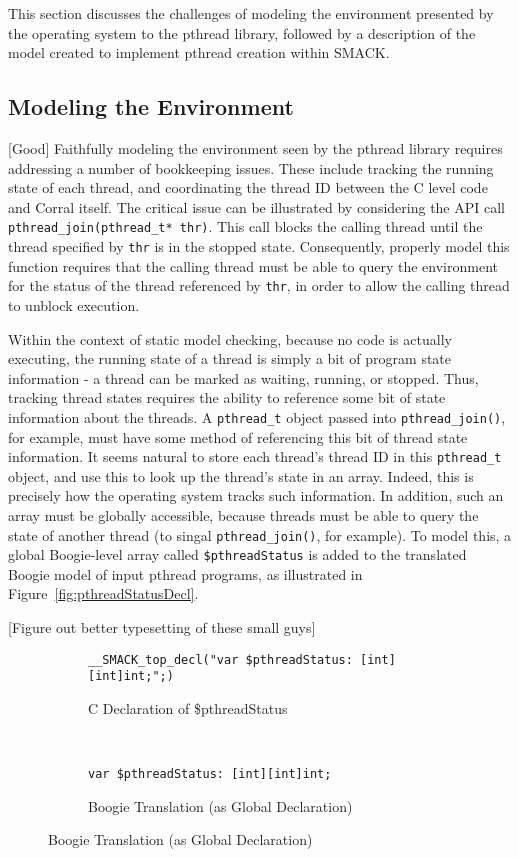 This section discusses the challenges of modeling the environment
presented by the operating system to the pthread library, followed by
a description of the model created to implement pthread creation
within SMACK.

\subsection{Modeling the Environment}
[Good]
Faithfully modeling the environment seen by the pthread library
requires addressing a number of bookkeeping issues.  These include
tracking the running state of each thread, and coordinating the thread
ID between the C level code and Corral itself.  The critical issue can
be illustrated by considering the API call
\lstinline|pthread_join(pthread_t* thr)|. This call blocks the calling
thread until the thread specified by \lstinline|thr| is in the stopped
state.  Consequently, properly model this function requires that the
calling thread must be able to query the environment for the status of
the thread referenced by \lstinline|thr|, in order to allow the
calling thread to unblock execution. 

Within the context of static model checking, because no code is
actually executing, the running state of a thread is simply a bit of
program state information - a thread can be marked as waiting,
running, or stopped. Thus, tracking thread states requires the ability
to reference some bit of state information about the threads. A
\lstinline|pthread_t| object passed into \lstinline|pthread_join()|,
for example, must have some method of referencing this bit of thread
state information.  It seems natural to store each thread's thread ID
in this \lstinline|pthread_t| object, and use this to look up the
thread's state in an array.  Indeed, this is precisely how the
operating system tracks such information.  In addition, such an array
must be globally accessible, because threads must be able to query the
state of another thread (to singal \lstinline|pthread_join()|, for
example).  To model this, a global Boogie-level array called
\lstinline|$pthreadStatus| is added to the translated Boogie model of
input pthread programs, as illustrated in
Figure~\ref{fig:pthreadStatusDecl}.

[Figure out better typesetting of these small guys]
\begin{figure}[h]
\centering
\caption{Declaring Global \$pthreadStatus}\label{fig:pthreadStatusDecl}
\begin{subfigure}[b]{1\textwidth}
\centering
\caption{C Declaration of \$pthreadStatus}\label{fig:pthreadStatusDecl_a}
\begin{lstlisting}
__SMACK_top_decl("var $pthreadStatus: [int][int]int;";)
\end{lstlisting}
\end{subfigure}
~
\begin{subfigure}[b]{1\textwidth}
\centering
\caption{Boogie Translation (as Global Declaration)}
\label{fig:pthreadStatusDecl_b}
\begin{lstlisting}[language=boogie]
var $pthreadStatus: [int][int]int;
\end{lstlisting}
\end{subfigure}
\end{figure}

